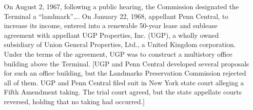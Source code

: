 On August 2, 1967, following a public hearing, the Commission designated the
Terminal a ``landmark''\ldots.
%
On January 22, 1968, appellant Penn Central, to increase its income, entered
into a renewable 50-year lease and sublease agreement with appellant UGP
Properties, Inc. (UGP), a wholly owned subsidiary of Union General Properties,
Ltd., a United Kingdom corporation. Under the terms of the agreement, UGP was to
construct a multistory office building above the Terminal.
[UGP and Penn Central developed several proposals for such an office building,
but the Landmarks Preservation Commission rejected all of them. UGP and Penn
Central filed suit in New York state court alleging a Fifth Amendment taking.
The trial court agreed, but the state appellate courts reversed, holding that no
taking had occurred.]
%

